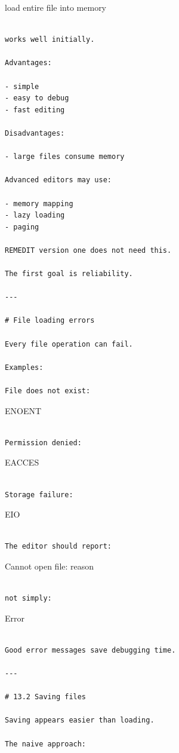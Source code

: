 \documentclass[
  oneside,
  openany]{book}
\begin{document}
load entire file into memory

\begin{verbatim}

works well initially.

Advantages:

- simple
- easy to debug
- fast editing

Disadvantages:

- large files consume memory

Advanced editors may use:

- memory mapping
- lazy loading
- paging

REMEDIT version one does not need this.

The first goal is reliability.

---

# File loading errors

Every file operation can fail.

Examples:

File does not exist:
\end{verbatim}

ENOENT

\begin{verbatim}

Permission denied:
\end{verbatim}

EACCES

\begin{verbatim}

Storage failure:
\end{verbatim}

EIO

\begin{verbatim}

The editor should report:
\end{verbatim}

Cannot open file: reason

\begin{verbatim}

not simply:
\end{verbatim}

Error

\begin{verbatim}

Good error messages save debugging time.

---

# 13.2 Saving files

Saving appears easier than loading.

The naive approach:
\end{verbatim}
\end{document}
